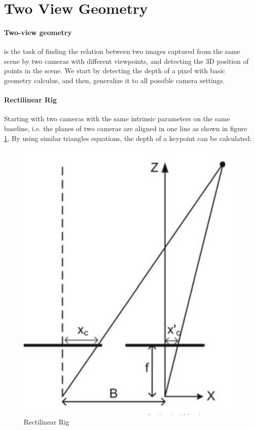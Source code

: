 \documentclass[11pt]{article}
\begin{document}
    \section{Two View Geometry}

    \paragraph{Two-view geometry} is the task of finding the relation between two images captured from the same scene
    by two cameras with different viewpoints, and detecting the 3D position of points in the scene. We start by
    detecting the depth of a pixel with basic geometry calculus, and then, generalize it to all possible camera settings.

    \paragraph{Rectilinear Rig} Starting with two cameras with the same intrinsic parameters on the same baseline, i.e. the planes of
    two cameras are aligned in one line as shown in figure \ref{fig:rect_rig}, By using similar triangles equations,
    the depth of a keypoint can be calculated:

    \begin{figure}
        \centering
        \includegraphics[scale=0.5]{images/two_view}
        \caption{Rectilinear Rig}
        \label{fig:rect_rig}
    \end{figure}
\end{document}
